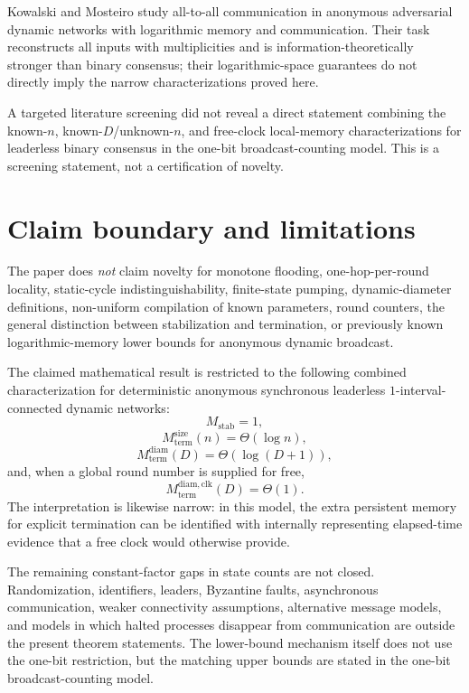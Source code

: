 \documentclass[11pt]{article}
\theoremstyle{remark}
\begin{document}
Kowalski and Mosteiro \cite{kowalski2026alltoall} study all-to-all communication in anonymous adversarial dynamic networks with logarithmic memory and communication. Their task reconstructs all inputs with multiplicities and is information-theoretically stronger than binary consensus; their logarithmic-space guarantees do not directly imply the narrow characterizations proved here.

A targeted literature screening did not reveal a direct statement combining the known-$n$, known-$D$/unknown-$n$, and free-clock local-memory characterizations for leaderless binary consensus in the one-bit broadcast-counting model. This is a screening statement, not a certification of novelty.

\section{Claim boundary and limitations}
The paper does \emph{not} claim novelty for monotone flooding, one-hop-per-round locality, static-cycle indistinguishability, finite-state pumping, dynamic-diameter definitions, non-uniform compilation of known parameters, round counters, the general distinction between stabilization and termination, or previously known logarithmic-memory lower bounds for anonymous dynamic broadcast.

The claimed mathematical result is restricted to the following combined characterization for deterministic anonymous synchronous leaderless $1$-interval-connected dynamic networks:
\[
M_{\mathrm{stab}}=1,
\]
\[
M_{\mathrm{term}}^{\mathrm{size}}(n)=\Theta(\log n),
\]
\[
M_{\mathrm{term}}^{\mathrm{diam}}(D)=\Theta(\log(D+1)),
\]
and, when a global round number is supplied for free,
\[
M_{\mathrm{term}}^{\mathrm{diam,clk}}(D)=\Theta(1).
\]
The interpretation is likewise narrow: in this model, the extra persistent memory for explicit termination can be identified with internally representing elapsed-time evidence that a free clock would otherwise provide.

The remaining constant-factor gaps in state counts are not closed. Randomization, identifiers, leaders, Byzantine faults, asynchronous communication, weaker connectivity assumptions, alternative message models, and models in which halted processes disappear from communication are outside the present theorem statements. The lower-bound mechanism itself does not use the one-bit restriction, but the matching upper bounds are stated in the one-bit broadcast-counting model.
\end{document}
